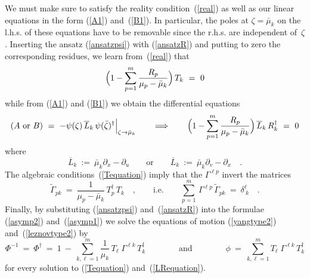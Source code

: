 \documentclass[a4paper,11pt]{article}
\numberwithin{equation}{section}
\def\pa{\mbox{$\partial$}}
\newcommand{\Tdag}{T^{\dagger}}
\newcommand{\Gt}{\widetilde{\Gamma}}
\begin{document}
We must make sure to satisfy the reality condition~(\ref{real}) as well as
our linear equations in the form (\ref{A1}) and~(\ref{B1}). In particular,
the poles at $\zeta=\bar{\mu}_k$ on the l.h.s. of these equations have to be
removable since the r.h.s. are independent of~$\zeta$. Inserting the ansatz
(\ref{ansatzpsi}) with (\ref{ansatzR}) and putting to zero the corresponding
residues, we learn from~(\ref{real}) that
\begin{equation} \label{Tequation}
\Bigl( 1-\sum_{p=1}^m \frac{R_p}{\mu_p-\bar{\mu}_k} \Bigr)\,T_k\ =\ 0
\end{equation}
while from (\ref{A1}) and (\ref{B1}) we obtain the differential equations
\begin{equation} \label{LRequation}
(A\ \textrm{or}\ B)\ =\
-\psi(\zeta)\,\overline{L}_k\,\psi(\bar{\zeta})^\dagger
\Big|_{\zeta\to\bar\mu_k}
\qquad\Longrightarrow\qquad
\Bigl( 1-\sum_{p=1}^m \frac{R_p}{\mu_p-\bar{\mu}_k} \Bigr)\,
\overline{L}_k\,R_k^\dagger\ =\ 0
\end{equation}
where
\begin{equation} \label{Ldef}
\overline{L}_k\ :=\ \bar{\mu}_k \pa_x - \pa_u
\qquad\textrm{or}\qquad
\overline{L}_k\ :=\ \bar{\mu}_k \pa_v - \pa_x \quad.
\end{equation}
The algebraic conditions~(\ref{Tequation}) imply that the $\Gamma^{\ell p}$
invert the matrices
\begin{equation}\label{Gamma}
\Gt_{pk}\ =\ \frac{1}{\mu_p{-}\bar{\mu}_k}\,\Tdag_p\,T_k
\quad, \qquad\textrm{i.e.}\qquad
\sum_{p=1}^m\,\Gamma^{\ell p}\,\Gt_{pk}\ =\
\delta_{\ k}^\ell \quad.
\end{equation}
Finally, by substituting (\ref{ansatzpsi}) and~(\ref{ansatzR}) into the
formulae (\ref{asymp2}) and~(\ref{asymp1}) we solve the equations of motion
(\ref{yangtype2}) and~(\ref{leznovtype2}) by
\begin{equation} \label{solform}
\Phi^{-1}\ =\ \Phi^{\dagger}\ =\
1\ -\ \sum_{k,\ell=1}^m \frac{1}{\mu_k}\,T_\ell\;\Gamma^{\ell k}\,T_k^\dagger
\qquad\qquad\textrm{and}\qquad\qquad
\phi\ =\ \sum_{k,\ell=1}^m T_\ell\;\Gamma^{\ell k}\,T_k^\dagger
\end{equation}
for every solution to (\ref{Tequation}) and~(\ref{LRequation}).
\end{document}
